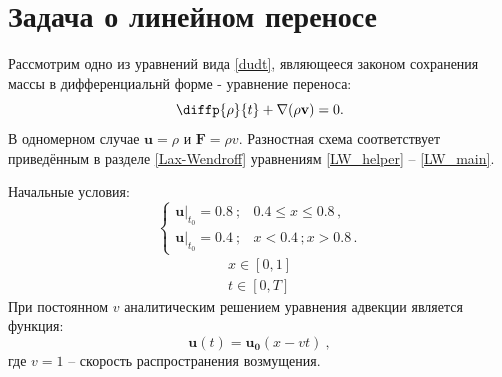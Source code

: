 \documentclass[a4paper]{article}
\begin{document}
	\section{Задача о линейном переносе}\label{transfer}
	Рассмотрим одно из уравнений вида \eqref{dudt}, являющееся законом сохранения массы в дифференциальнй форме - уравнение переноса:
	\begin{equation}\label{eqTransfer}
		\diffp{\rho}{t} + \nabla ( \rho \mathbf{v} ) = 0 .
	\end{equation}
	В одномерном случае $\mathbf{u} = \rho$ и $\mathbf{F} = \rho v$. Разностная схема соответствует приведённым в разделе \ref{Lax-Wendroff} уравнениям \eqref{LW_helper} -- \eqref{LW_main}.
	
	Начальные условия:
	\begin{equation}\label{initTransfer}
		\begin{cases}
			\left.\mathbf{u}\right|_{t_0} = 0.8\:;		&		0.4 \leqslant x \leqslant 0.8 \, ,	\\
			\left.\mathbf{u}\right|_{t_0} = 0.4\:;		&		x < 0.4\,; x > 0.8 \, .
		\end{cases}
	\end{equation}
	\[
		\begin{aligned}
			x \in [0, 1] \\
			t \in [0, T]
		\end{aligned}
	\]
	При постоянном $v$ аналитическим решением уравнения адвекции является функция:
	\begin{equation}
		\mathbf{u}(t) = \mathbf{u_0}(x - vt) \: ,
	\end{equation}
	где $v = 1$ -- скорость распространения возмущения. 
	
\end{document}
